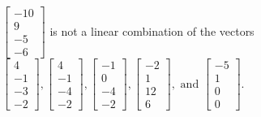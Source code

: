 \begin{exercise}
\begin{exerciseStatement}
  \end{exerciseStatement}
  \begin{exerciseAnswer}
   \(\left[\begin{array}{c}
-10 \\
9 \\
-5 \\
-6
\end{array}\right]\) 
  	 is not  
	a linear combination of the vectors \(\left[\begin{array}{c}
4 \\
-1 \\
-3 \\
-2
\end{array}\right] , \left[\begin{array}{c}
4 \\
-1 \\
-4 \\
-2
\end{array}\right] , \left[\begin{array}{c}
-1 \\
0 \\
-4 \\
-2
\end{array}\right] , \left[\begin{array}{c}
-2 \\
1 \\
12 \\
6
\end{array}\right] , \text{ and } \left[\begin{array}{c}
-5 \\
1 \\
0 \\
0
\end{array}\right]\).

	
  


  \end{exerciseAnswer}
\end{exercise}